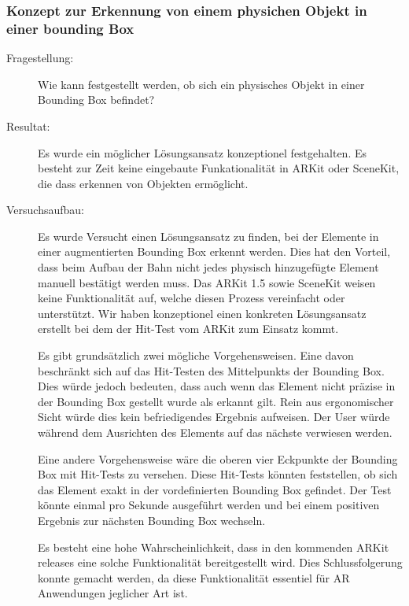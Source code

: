 \subsubsection{Konzept zur Erkennung von einem physichen Objekt in einer bounding Box}\label{subsub:prot-boundingbox}
\begin{description}
    \item[Fragestellung:] Wie kann festgestellt werden, ob sich ein physisches Objekt in einer Bounding Box befindet?
	\item[Resultat:] Es wurde ein möglicher Lösungsansatz konzeptionel festgehalten. Es besteht zur Zeit keine eingebaute Funkationalität in ARKit oder SceneKit, die dass erkennen von Objekten ermöglicht. 
    \item[Versuchsaufbau:] Es wurde Versucht einen Lösungsansatz zu finden, bei der Elemente in einer augmentierten Bounding Box erkennt werden. Dies hat den Vorteil, dass beim Aufbau der Bahn nicht jedes physisch hinzugefügte Element manuell bestätigt werden muss. 
    Das ARKit 1.5 sowie SceneKit weisen keine Funktionalität auf, welche diesen Prozess vereinfacht oder unterstützt. Wir haben konzeptionel einen konkreten Lösungsansatz erstellt bei dem der Hit-Test vom ARKit zum Einsatz kommt. 

    Es gibt grundsätzlich zwei mögliche Vorgehensweisen. Eine davon beschränkt sich auf das Hit-Testen des Mittelpunkts der Bounding Box. Dies würde jedoch bedeuten, dass auch wenn das Element nicht präzise in der Bounding Box gestellt wurde als erkannt gilt. Rein aus ergonomischer Sicht würde dies kein befriedigendes Ergebnis aufweisen. Der User würde während dem Ausrichten des Elements auf das nächste verwiesen werden. 
    
    Eine andere Vorgehensweise wäre die oberen vier Eckpunkte der Bounding Box mit Hit-Tests zu versehen. Diese Hit-Tests könnten feststellen, ob sich das Element exakt in der vordefinierten Bounding Box gefindet. Der Test könnte einmal pro Sekunde ausgeführt werden und bei einem positiven Ergebnis zur nächsten Bounding Box wechseln.

    Es besteht eine hohe Wahrscheinlichkeit, dass in den kommenden ARKit releases eine solche Funktionalität bereitgestellt wird. Dies Schlussfolgerung konnte gemacht werden, da diese Funktionalität essentiel für AR Anwendungen jeglicher Art ist. 


\end{description}
